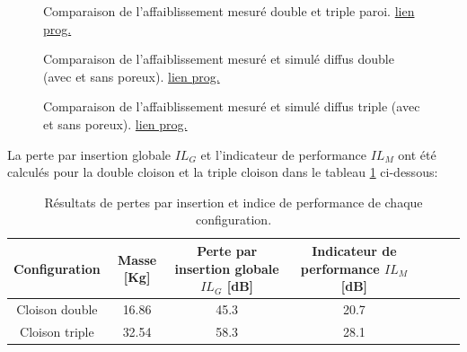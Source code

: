 \documentclass[12pt,foolscap]{report}
\begin{document}
	\begin{figure}[h]
		\begin{center}
			\caption{Comparaison de l'affaiblissement mesuré double et triple paroi. \href{https://github.com/Nuopel/Encoffrement/blob/master/Mesures\%20encoffrements-20170818/analyse_meas.m}{lien prog.}  }
			\label{compmeas}
		\end{center}
	\end{figure}
	\begin{figure}[h]
		\begin{minipage}[c]{.45\linewidth}
			\begin{center}
				\caption{Comparaison de l'affaiblissement mesuré et simulé diffus double (avec et sans poreux). \href{https://github.com/Nuopel/Encoffrement/blob/master/Mesures\%20encoffrements-20170818/analyse_meas.m}{lien prog.}    }
				\label{compmeasthdouble}
			\end{center}
		\end{minipage}
		\hfill
		\begin{minipage}[c]{.45\linewidth}
			\begin{center}
				\caption{Comparaison de l'affaiblissement mesuré et simulé diffus triple   (avec et sans poreux).  \href{https://github.com/Nuopel/Encoffrement/blob/master/Mesures\%20encoffrements-20170818/analyse_meas.m}{lien prog.}  }
				\label{compmeasthtriple}
			\end{center}
		\end{minipage}
	\end{figure}
	
	
	La perte par insertion globale $IL_G$ et l'indicateur de performance $IL_M$ ont été calculés pour la double cloison et la triple cloison dans le tableau \ref{tab:resultatsIL} ci-dessous: \\
	\begin{table}[h!]
		\centering
		\begin{tabular}{|c|c|c|c|c|c|c|}
			\hline
			Configuration& Masse [Kg]& Perte par insertion globale $IL_G$ [dB]& Indicateur de performance $IL_M$ [dB]\\ \hline
			Cloison double & 16.86 & 45.3 & 20.7 \\ \hline
			Cloison triple & 32.54 & 58.3 & 28.1 \\ \hline
		\end{tabular}
		\caption{Résultats de pertes par insertion et indice de performance de chaque configuration.}
		\label{tab:resultatsIL}
	\end{table}
	
\end{document}
